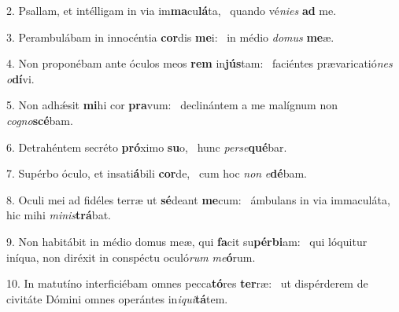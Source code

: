 2. Psallam, et intélligam in via im\textbf{ma}cu\textbf{lá}ta, \ast\  quando vé\textit{ni}\textit{es} \textbf{ad} me.\

3. Perambulábam in innocéntia \textbf{cor}dis \textbf{me}i: \ast\  in médio \textit{do}\textit{mus} \textbf{me}æ.\

4. Non proponébam ante óculos meos \textbf{rem} in\textbf{jús}tam: \ast\  faciéntes prævaricatió\textit{nes} \textit{o}\textbf{dí}vi.\

5. Non adhǽsit \textbf{mi}hi cor \textbf{pra}vum: \ast\  declinántem a me malígnum non \textit{co}\textit{gno}\textbf{scé}bam.\

6. Detrahéntem secréto \textbf{pró}ximo \textbf{su}o, \ast\  hunc \textit{per}\textit{se}\textbf{qué}bar.\

7. Supérbo óculo, et insati\textbf{á}bili \textbf{cor}de, \ast\  cum hoc \textit{non} \textit{e}\textbf{dé}bam.\

8. Oculi mei ad fidéles terræ ut \textbf{sé}deant \textbf{me}cum: \ast\  ámbulans in via immaculáta, hic mihi \textit{mi}\textit{nis}\textbf{trá}bat.\

9. Non habitábit in médio domus meæ, qui \textbf{fa}cit su\textbf{pér}\textbf{bi}am: \ast\  qui lóquitur iníqua, non diréxit in conspéctu oculó\textit{rum} \textit{me}\textbf{ó}rum.\

10. In matutíno interficiébam omnes pecca\textbf{tó}res \textbf{ter}ræ: \ast\  ut dispérderem de civitáte Dómini omnes operántes in\textit{i}\textit{qui}\textbf{tá}tem.\

